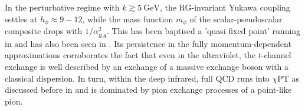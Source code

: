 \documentclass[aps,twocolumn,prd,superscriptaddress]{revtex4-2}
\begin{document}
In the perturbative regime with $k\gtrsim \qty{5}{\GeV}$, the RG-invariant Yukawa coupling settles at $h_\phi \approx 9 - 12 $, while the mass function $m_\phi$ of the scalar-pseudoscalar composite drops with $1/\alpha_{l\bar l A}^2$. 
This has been baptised a 'quasi fixed point' running in \cite{Gies:2002hq} and has also been seen in \cite{Gies:2002hq, Braun:2008pi, Braun:2009gm, Braun:2014ata, Rennecke:2015eba, Fu:2019hdw, Mitter:2014wpa, Cyrol:2017ewj}. Its persistence in the fully momentum-dependent approximations \cite{Mitter:2014wpa, Cyrol:2017ewj} corroborates the fact that even in the ultraviolet, the $t$-channel exchange is well described by an exchange of a massive exchange boson with a classical dispersion.
In turn, within the deep infrared, full QCD runs into $\chi$PT as discussed before in  and is dominated by pion exchange processes of a point-like pion. 
\end{document}
